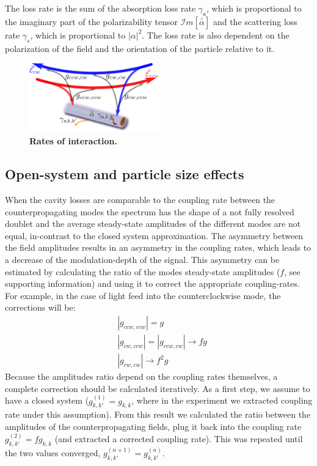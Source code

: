 \documentclass[journal=jacsat,manuscript=article]{achemso}
\begin{document}
The loss rate is the sum of the absorption loss rate $\gamma_a$, which is proportional to the imaginary part of the polarizability tensor $\mathcal{I}m[\bar{ \bar \alpha}]$ and the scattering loss rate $\gamma_s$, which is proportional to $|\alpha|^2$. The loss rate is also dependent on the polarization of the field and the orientation of the particle relative to it.
\begin{figure}[H]
\centering
             \includegraphics[trim=0cm 0.0cm 0.0cm 0.0cm, clip, width=0.5\textwidth]{Images/interaction.png}
             \caption{\textbf{Rates of interaction.} }
              \label{fig:cavity_tube_int}
  \end{figure}\vspace{-1cm}

\subsection{Open-system and particle size effects}

When the cavity losses are comparable to the coupling rate between the counterpropagating modes the spectrum has the shape of a not fully resolved doublet and the average steady-state amplitudes of the different modes are not equal, in-contrast to the closed system approximation. The asymmetry between the field amplitudes results in an asymmetry in the coupling rates, which leads to a decrease of the modulation-depth of the signal. This asymmetry can be estimated by calculating the ratio of the modes steady-state amplitudes ($f$, see supporting information) and using it to correct the appropriate coupling-rates. For example, in the case of light feed into the counterclockwise mode, the corrections will be:
\begin{align*}
&\left| g_{ccw,ccw} \right| = g \\
&\left| g_{cw,ccw} \right| = \left| g_{ccw,cw} \right| \rightarrow f g \\
&\left| g_{cw,cw} \right| \rightarrow f^2 g
\end{align*}
Because the amplitudes ratio depend on the coupling rates themselves, a complete correction should be calculated iteratively. As a first step, we assume to have a closed system ($g_{k,k'}^{(1)} = g_{k,k}$, where in the experiment we extracted coupling rate under this assumption). From this result we calculated the ratio between the amplitudes of the counterpropagating fields, plug it back into the coupling rate $g_{k,k'}^{(2)} = fg_{k,k}$ (and extracted a corrected coupling rate). This was repeated until the two values converged, $g_{k,k'}^{(n+1)} = g_{k,k'}^{(n)}$.
\end{document}
